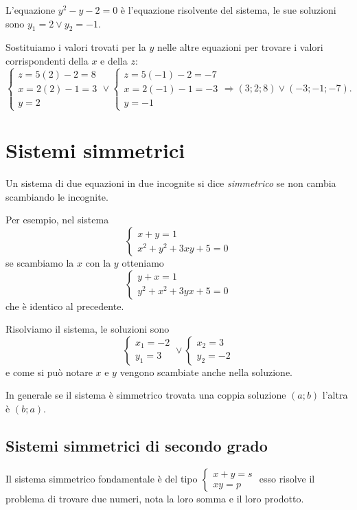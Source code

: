 \begin{exrig}
\begin{esempio}
L'equazione \(y^2-y-2=0\) è l'equazione risolvente del sistema, le sue soluzioni sono \(y_1=2\vee y_2=-1\).

Sostituiamo i valori trovati per la \( y \) nelle altre equazioni per trovare i valori corrispondenti della \( x \) e della \( z \): \[ \left\{\begin{array}{l}z=5(2)-2=8 \\x=2(2)-1=3 \\y=2 \end{array}\right.\vee \left\{\begin{array}{l}z=5(-1)-2=-7 \\x=2(-1)-1=-3 \\y=-1 \end{array}\right.\Rightarrow (3;2;8)\vee (-3;-1;-7). \]
\end{esempio}
\end{exrig}
\ovalbox{\risolvii \ref{ese:6.12}, \ref{ese:6.13}}

\section{Sistemi simmetrici}
Un sistema di due equazioni in due incognite si dice \emph{simmetrico} se non cambia scambiando le incognite.

Per esempio, nel sistema 
\[\left\{\begin{array}{l}{x+y=1}\\{x^2+y^2+3{xy}+5=0}\end{array}\right.\] se scambiamo la \(x\) con la \(y\) otteniamo 
\[\left\{\begin{array}{l}{y+x=1}\\{y^2+x^2+3{yx}+5=0}\end{array}\right.\] che è identico al precedente.

Risolviamo il sistema, le soluzioni sono 
\[\left\{\begin{array}{l}{x_1=-2}\\{y_1=3}\end{array}\right.\vee \left\{\begin{array}{l}{x_2=3}\\{y_2=-2}\end{array}\right.\] 
e come si può notare \(x\) e \(y\) vengono scambiate anche nella soluzione.

In generale se il sistema è simmetrico trovata una coppia soluzione \((a;b)\) l'altra è \((b;a)\).

\subsection{Sistemi simmetrici di secondo grado}
Il sistema simmetrico fondamentale è del tipo \(\left\{\begin{array}{l}{x+y=s}\\{xy=p}\end{array}\right.\) esso risolve il problema di trovare due numeri, nota la loro somma e il loro prodotto.

